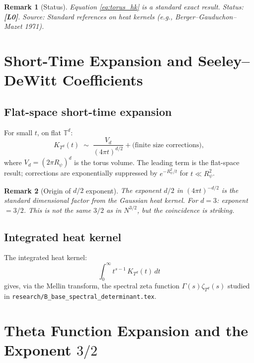 \documentclass[11pt,a4paper]{article}
\newtheorem{remark}{Remark}
\begin{document}
\begin{remark}[Status]
  Equation \eqref{eq:torus_hk} is a standard exact result.
  Status: \textbf{[L0]}.
  Source: Standard references on heat kernels (e.g., Berger--Gauduchon--Mazet 1971).
\end{remark}

\section{Short-Time Expansion and Seeley--DeWitt Coefficients}
\label{sec:sdw}

\subsection{Flat-space short-time expansion}

For small $t$, on flat $\mathbb{T}^d$:
\begin{equation}
\label{eq:hk_expansion}
  K_{T^d}(t) \;\sim\; \frac{V_d}{(4\pi t)^{d/2}} + \text{(finite size corrections)},
\end{equation}
where $V_d = (2\pi R_\psi)^d$ is the torus volume.  The leading term is the
flat-space result; corrections are exponentially suppressed by
$e^{-R_\psi^2/t}$ for $t \ll R_\psi^2$.

\begin{remark}[Origin of $d/2$ exponent]
  The exponent $d/2$ in $(4\pi t)^{-d/2}$ is the standard dimensional
  factor from the Gaussian heat kernel.  For $d = 3$: exponent $= 3/2$.
  This is \emph{not} the same $3/2$ as in $N^{3/2}$, but the coincidence
  is striking.
\end{remark}

\subsection{Integrated heat kernel}

The integrated heat kernel:
\begin{equation}
\label{eq:int_hk}
  \int_0^\infty t^{s-1}\, K_{T^d}(t)\, dt
\end{equation}
gives, via the Mellin transform, the spectral zeta function
$\Gamma(s) \zeta_{T^d}(s)$ studied in \texttt{research/B\_base\_spectral\_determinant.tex}.

\section{Theta Function Expansion and the Exponent \texorpdfstring{$3/2$}{3/2}}
\label{sec:theta}
\end{document}
